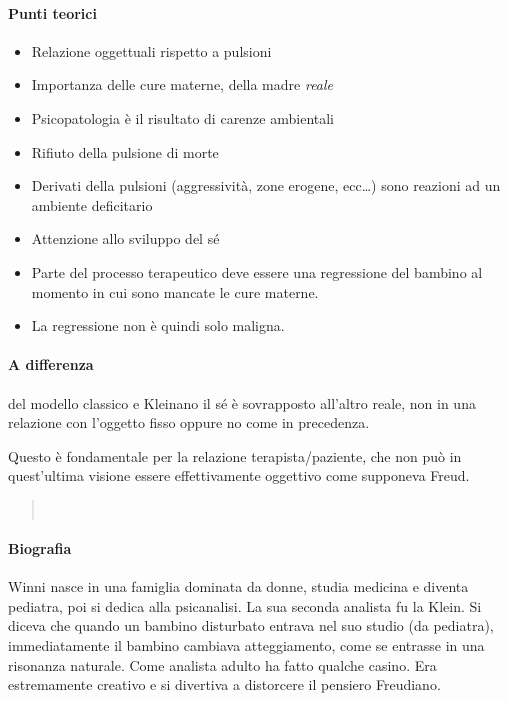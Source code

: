 \documentclass[12pt, a4paper]{article}
\begin{document}
\paragraph{Punti teorici}
\begin{itemize}
    \item Relazione oggettuali rispetto a pulsioni
    \item Importanza delle cure materne, della madre \emph{reale}
    \item Psicopatologia \`e il risultato di carenze ambientali
    \item Rifiuto della pulsione di morte
    \item Derivati della pulsioni (aggressivit\`a, zone erogene, ecc\ldots) sono reazioni ad un ambiente deficitario
    \item Attenzione allo sviluppo del s\'e
    \item Parte del processo terapeutico deve essere una regressione del bambino al momento in cui sono mancate le cure materne.
    \item La regressione non \`e quindi solo maligna.
\end{itemize}

\paragraph{A differenza} del modello classico e Kleinano il s\'e \`e sovrapposto all'altro reale, non in una relazione con l'oggetto fisso oppure no come in precedenza.

Questo \`e fondamentale per la relazione terapista/paziente, che non può in quest'ultima visione essere effettivamente oggettivo come supponeva Freud.

\begin{quote}
    \\ 
\end{quote}

\paragraph{Biografia} Winni nasce in una famiglia dominata da donne, studia medicina e diventa pediatra, poi si dedica alla psicanalisi. La sua seconda analista fu la Klein. Si diceva che quando un bambino disturbato entrava nel suo studio (da pediatra), immediatamente il bambino cambiava atteggiamento, come se entrasse in una risonanza naturale. Come analista adulto ha fatto qualche casino. Era estremamente creativo e si divertiva a distorcere il pensiero
Freudiano. 
\end{document}
